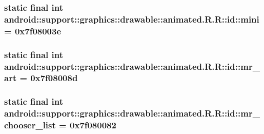 \hypertarget{classandroid_1_1support_1_1graphics_1_1drawable_1_1animated_1_1_r_1_1id_4c72e0909fcdb68440d0fcc583c6a9e8}{
\subsubsection[{mini}]{\setlength{\rightskip}{0pt plus 5cm}static final int android::support::graphics::drawable::animated.R.R::id::mini = 0x7f08003e}}
\label{classandroid_1_1support_1_1graphics_1_1drawable_1_1animated_1_1_r_1_1id_4c72e0909fcdb68440d0fcc583c6a9e8}


\hypertarget{classandroid_1_1support_1_1graphics_1_1drawable_1_1animated_1_1_r_1_1id_101888d41e8b4bd2b8030679826e0785}{
\subsubsection[{mr\_\-art}]{\setlength{\rightskip}{0pt plus 5cm}static final int android::support::graphics::drawable::animated.R.R::id::mr\_\-art = 0x7f08008d}}
\label{classandroid_1_1support_1_1graphics_1_1drawable_1_1animated_1_1_r_1_1id_101888d41e8b4bd2b8030679826e0785}


\hypertarget{classandroid_1_1support_1_1graphics_1_1drawable_1_1animated_1_1_r_1_1id_a6bad4f6df285e2807bb836f7fe02aaa}{
\subsubsection[{mr\_\-chooser\_\-list}]{\setlength{\rightskip}{0pt plus 5cm}static final int android::support::graphics::drawable::animated.R.R::id::mr\_\-chooser\_\-list = 0x7f080082}}
\label{classandroid_1_1support_1_1graphics_1_1drawable_1_1animated_1_1_r_1_1id_a6bad4f6df285e2807bb836f7fe02aaa}


